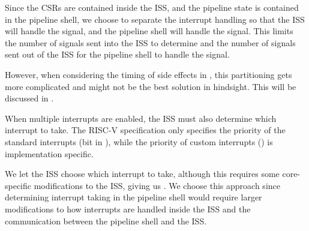 Since the CSRs are contained inside the ISS, and the pipeline state is contained in the pipeline shell, we choose to separate the interrupt handling so that the ISS will handle the  signal, and the pipeline shell will handle the  signal. This limits the number of signals sent into the ISS to determine  and the number of signals sent out of the ISS for the pipeline shell to handle the  signal.

However, when considering the timing of side effects in , this partitioning gets more complicated and might not be the best solution in hindsight. This will be discussed in .



When multiple interrupts are enabled, the ISS must also determine which interrupt to take. The RISC-V specification \cite{watermanRISCVInstructionSet2021} only specifies the priority of the standard interrupts (bit  in ), while the priority of custom interrupts () is implementation specific.

We let the ISS choose which interrupt to take, although this requires some core-specific modifications to the ISS, giving us \textbf{}. We choose this approach since determining interrupt taking in the pipeline shell would require larger modifications to how interrupts are handled inside the ISS and the communication between the pipeline shell and the ISS.



